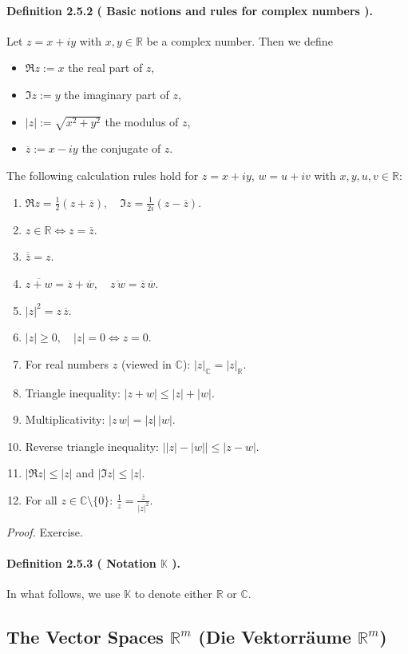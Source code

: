 \documentclass[12pt,a4paper]{article}
\newcommand{\R}{\mathbb{R}}
\newcommand{\C}{\mathbb{C}}
\newcommand{\K}{\mathbb{K}} %
\newcommand{\NumberedDefinition}[3]{%
\paragraph*{Definition #1 ( #2 ).} #3\par}
\theoremstyle{plain}
\theoremstyle{definition}
\theoremstyle{remark}
\begin{document}
\NumberedDefinition{2.5.2}{Basic notions and rules for complex numbers}{
Let $z=x+iy$ with $x,y\in\R$ be a complex number. Then we define
\begin{itemize}[leftmargin=*]
	\item $\Re z := x$ the real part of $z$,
	\item $\Im z := y$ the imaginary part of $z$,
	\item $|z| := \sqrt{x^2+y^2}$ the modulus of $z$,
	\item $\overline{z} := x - iy$ the conjugate of $z$.
\end{itemize}
The following calculation rules hold for
$z=x+iy$, $w=u+iv$ with $x,y,u,v\in\R$:
\begin{enumerate}[label={(\arabic*)}, leftmargin=*]
	\item $\Re z = \tfrac12(z+\overline{z}),\quad \Im z = \tfrac{1}{2i}(z-\overline{z})$.
	\item $z\in\R \iff z=\overline{z}$.
	\item $\overline{\overline{z}}=z$.
	\item $\overline{z+w}=\overline{z}+\overline{w},\quad \overline{z\,w}=\overline{z}\,\overline{w}$.
	\item $|z|^2 = z\,\overline{z}$.
	\item $|z|\ge 0,\quad |z|=0 \iff z=0$.
	\item For real numbers $z$ (viewed in $\C$): $|z|_{\C}=|z|_{\R}$.
	\item Triangle inequality: $|z+w|\le |z|+|w|$.
	\item Multiplicativity: $|z\,w|=|z|\,|w|$.
	\item Reverse triangle inequality: $\big||z|-|w|\big| \le |z-w|$.
	\item $|\Re z|\le |z|$ and $|\Im z|\le |z|$.
	\item For all $z\in\C\setminus\{0\}$: $\displaystyle \frac{1}{z}=\frac{\overline{z}}{|z|^2}$.
\end{enumerate}
\emph{Proof.} Exercise.
}


\NumberedDefinition{2.5.3}{Notation $\K$}{In what follows, we use $\K$ to denote either $\R$ or $\C$.}
\subsection{The Vector Spaces \texorpdfstring{$\R^m$}{R^m} (Die Vektorräume \texorpdfstring{$\R^m$}{R^m})}
\end{document}
